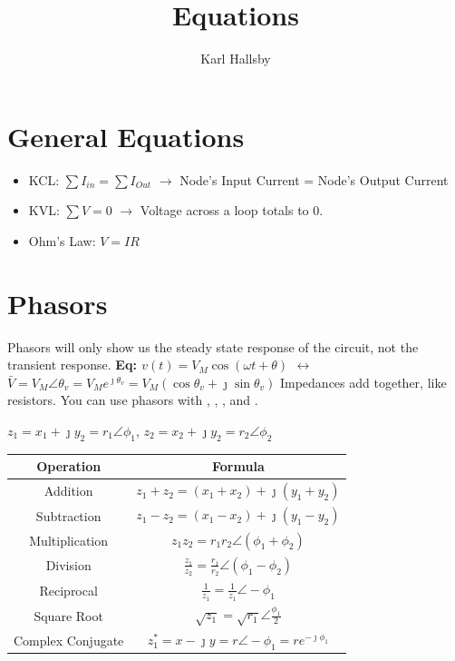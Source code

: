 \documentclass[10pt,letterpaper,final,twoside,notitlepage]{article}
\author{Karl Hallsby}
\title{Equations}
\begin{document}
\section*{General Equations}
	\begin{itemize}[noitemsep] %
		\item KCL: $\sum I_{in} = \sum I_{Out}$ $\rightarrow$ Node's Input Current = Node's Output Current
		\item KVL: $\sum V = 0$ $\rightarrow$ Voltage across a loop totals to 0.
		\item Ohm's Law: $V=IR$
	\end{itemize}

\section*{Phasors} \label{sec:Phasors}
Phasors will only show us the steady state response of the circuit, not the transient response. \newline \newline
\textbf{\large Eq: $v(t)=V_{M} \cos \left(\omega t + \theta \right)$ $\leftrightarrow$ $\bar{V}=V_{M} \angle \theta_{v} = V_{M}e^{\jmath \theta_{v}} = V_{M}\left(\cos \theta_{v} + \jmath \sin \theta_{v}\right)$} \newline
Impedances add together, like resistors.
You can use phasors with , , , and . \newline
	\begin{table}[ht] %
		\centering
		\renewcommand{\arraystretch}{1.4}
		$z_1=x_1+\jmath y_2=r_1\angle\phi_1$, $z_2=x_2+\jmath y_2=r_2\angle\phi_2$
		\begin{tabular}{|c|c|} 
			\hline
			Operation & Formula \\ \hline
			Addition & $z_1+z_2=\left( x_1+x_2 \right)+ \jmath \left( y_1+y_2 \right)$ \\ \hline
			Subtraction & $z_1-z_2=\left( x_1-x_2 \right)+ \jmath \left( y_1-y_2 \right)$ \\ \hline
			Multiplication & $z_{1}z_{2}=r_{1}r_{2}\angle \left( \phi_1 + \phi_2 \right)$ \\ \hline
			Division & $\frac{z_{1}}{z_{2}} = \frac{r_{1}}{r_{2}} \angle \left(\phi_1 - \phi_2 \right)$ \\ \hline
			Reciprocal & $\frac{1}{z_1}=\frac{1}{z_1} \angle -\phi_1$ \\ \hline
			Square Root & $\sqrt{z_1}=\sqrt{r_1} \angle \frac{\phi_1}{2}$ \\ \hline
			Complex Conjugate & $ z_1^*=x- \jmath y=r \angle -\phi_1=re^{-\jmath \phi_1}$\\ \hline
		\end{tabular}
	\end{table}
\end{document}
